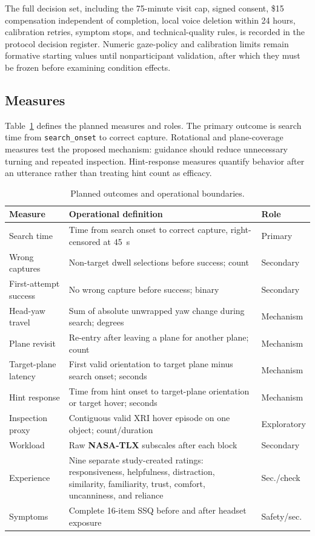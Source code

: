 \documentclass[10pt,journal,compsoc]{IEEEtran}
\begin{document}
The full decision set, including the 75-minute visit cap, signed consent, \$15 compensation independent of completion, local voice deletion within 24 hours, calibration retries, symptom stops, and technical-quality rules, is recorded in the protocol decision register. Numeric gaze-policy and calibration limits remain formative starting values until nonparticipant validation, after which they must be frozen before examining condition effects.

\subsection{Measures}
Table~\ref{tab:measures} defines the planned measures and roles. The primary outcome is search time from \texttt{search\_onset} to correct capture. Rotational and plane-coverage measures test the proposed mechanism: guidance should reduce unnecessary turning and repeated inspection. Hint-response measures quantify behavior after an utterance rather than treating hint count as efficacy.

\begin{table}[t]
\caption{Planned outcomes and operational boundaries.}
\label{tab:measures}
\centering
\footnotesize
\begin{tabular}{p{}p{}p{}}
\toprule
\textbf{Measure} & \textbf{Operational definition} & \textbf{Role} \\
\midrule
Search time & Time from search onset to correct capture, right-censored at 45~s & Primary \\
Wrong captures & Non-target dwell selections before success; count & Secondary \\
First-attempt success & No wrong capture before success; binary & Secondary \\
Head-yaw travel & Sum of absolute unwrapped yaw change during search; degrees & Mechanism \\
Plane revisit & Re-entry after leaving a plane for another plane; count & Mechanism \\
Target-plane latency & First valid orientation to target plane minus search onset; seconds & Mechanism \\
Hint response & Time from hint onset to target-plane orientation or target hover; seconds & Mechanism \\
Inspection proxy & Contiguous valid XRI hover episode on one object; count/duration & Exploratory \\
Workload & Raw \textbf{NASA-TLX} subscales after each block & Secondary \\
Experience & Nine separate study-created ratings: responsiveness, helpfulness, distraction, similarity, familiarity, trust, comfort, uncanniness, and reliance & Sec./check \\
Symptoms & Complete 16-item SSQ before and after headset exposure & Safety/sec. \\
\bottomrule
\end{tabular}
\end{table}
\end{document}
